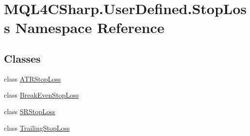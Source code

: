\hypertarget{namespace_m_q_l4_c_sharp_1_1_user_defined_1_1_stop_loss}{}\section{M\+Q\+L4\+C\+Sharp.\+User\+Defined.\+Stop\+Loss Namespace Reference}
\label{namespace_m_q_l4_c_sharp_1_1_user_defined_1_1_stop_loss}
\subsection*{Classes}
\begin{DoxyCompactItemize}
\item 
class \hyperlink{class_m_q_l4_c_sharp_1_1_user_defined_1_1_stop_loss_1_1_a_t_r_stop_loss}{A\+T\+R\+Stop\+Loss}
\item 
class \hyperlink{class_m_q_l4_c_sharp_1_1_user_defined_1_1_stop_loss_1_1_break_even_stop_loss}{Break\+Even\+Stop\+Loss}
\item 
class \hyperlink{class_m_q_l4_c_sharp_1_1_user_defined_1_1_stop_loss_1_1_s_r_stop_loss}{S\+R\+Stop\+Loss}
\item 
class \hyperlink{class_m_q_l4_c_sharp_1_1_user_defined_1_1_stop_loss_1_1_trailing_stop_loss}{Trailing\+Stop\+Loss}
\end{DoxyCompactItemize}
